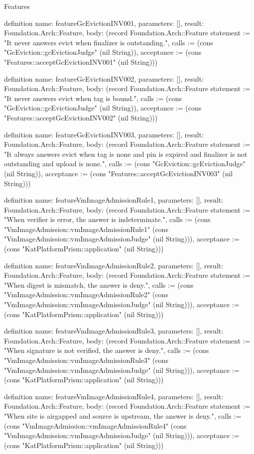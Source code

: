 \begin{lexlean}{Features}
\begin{semanticmodule}
definition{
  name: featureGcEvictionINV001,
  parameters: [],
  result: Foundation.Arch::Feature,
  body: (record Foundation.Arch::Feature {statement := "It never answers evict when finalizer is outstanding.", calls := (cons "GcEviction::gcEvictionJudge" (nil String)), acceptance := (cons "Features::acceptGcEvictionINV001" (nil String))})
}

definition{
  name: featureGcEvictionINV002,
  parameters: [],
  result: Foundation.Arch::Feature,
  body: (record Foundation.Arch::Feature {statement := "It never answers evict when tag is bound.", calls := (cons "GcEviction::gcEvictionJudge" (nil String)), acceptance := (cons "Features::acceptGcEvictionINV002" (nil String))})
}

definition{
  name: featureGcEvictionINV003,
  parameters: [],
  result: Foundation.Arch::Feature,
  body: (record Foundation.Arch::Feature {statement := "It always answers evict when tag is none and pin is expired and finalizer is not outstanding and upload is none.", calls := (cons "GcEviction::gcEvictionJudge" (nil String)), acceptance := (cons "Features::acceptGcEvictionINV003" (nil String))})
}

definition{
  name: featureVmImageAdmissionRule1,
  parameters: [],
  result: Foundation.Arch::Feature,
  body: (record Foundation.Arch::Feature {statement := "When verifier is error, the answer is indeterminate.", calls := (cons "VmImageAdmission::vmImageAdmissionRule1" (cons "VmImageAdmission::vmImageAdmissionJudge" (nil String))), acceptance := (cons "KatPlatformPrism::application" (nil String))})
}

definition{
  name: featureVmImageAdmissionRule2,
  parameters: [],
  result: Foundation.Arch::Feature,
  body: (record Foundation.Arch::Feature {statement := "When digest is mismatch, the answer is deny.", calls := (cons "VmImageAdmission::vmImageAdmissionRule2" (cons "VmImageAdmission::vmImageAdmissionJudge" (nil String))), acceptance := (cons "KatPlatformPrism::application" (nil String))})
}

definition{
  name: featureVmImageAdmissionRule3,
  parameters: [],
  result: Foundation.Arch::Feature,
  body: (record Foundation.Arch::Feature {statement := "When signature is not verified, the answer is deny.", calls := (cons "VmImageAdmission::vmImageAdmissionRule3" (cons "VmImageAdmission::vmImageAdmissionJudge" (nil String))), acceptance := (cons "KatPlatformPrism::application" (nil String))})
}

definition{
  name: featureVmImageAdmissionRule4,
  parameters: [],
  result: Foundation.Arch::Feature,
  body: (record Foundation.Arch::Feature {statement := "When site is airgapped and source is upstream, the answer is deny.", calls := (cons "VmImageAdmission::vmImageAdmissionRule4" (cons "VmImageAdmission::vmImageAdmissionJudge" (nil String))), acceptance := (cons "KatPlatformPrism::application" (nil String))})
}


\end{semanticmodule}
\end{lexlean}
